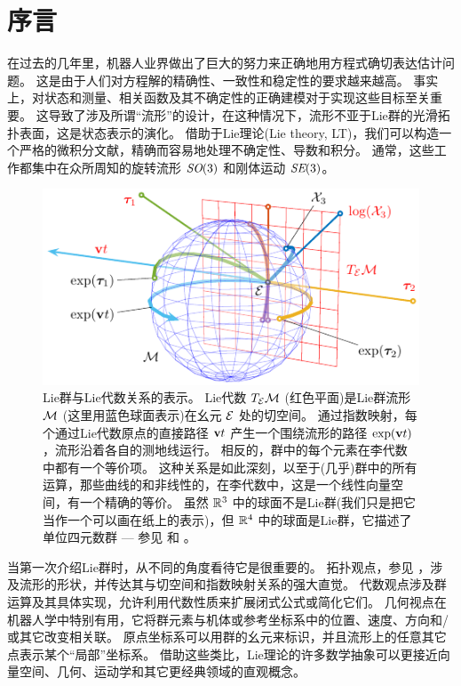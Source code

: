 
\section{序言}
\label{sec:intro}

在过去的几年里，机器人业界做出了巨大的努力来正确地用方程式确切表达估计问题。 
这是由于人们对方程解的精确性、一致性和稳定性的要求越来越高。 
事实上，对状态和测量、相关函数及其不确定性的正确建模对于实现这些目标至关重要。
这导致了涉及所谓“流形”的设计，在这种情况下，流形不亚于Lie群的光滑拓扑表面，这是状态表示的演化。
借助于Lie理论(Lie theory, LT)，我们可以构造一个严格的微积分文献，精确而容易地处理不确定性、导数和积分。
通常，这些工作都集中在众所周知的旋转流形 $\textit{SO}(3)$ 和刚体运动 $\textit{SE}(3)$。

\begin{figure}[tb]
\centering
\includegraphics{figures/exponential}
\caption{Lie群与Lie代数关系的表示。
Lie代数 $T_{\mathcal{E}}{\mathcal{M}}$ (红色平面)是Lie群流形 $\mathcal{M}$ (这里用蓝色球面表示)在幺元 $\mathcal{E}$ 处的切空间。
通过指数映射，每个通过Lie代数原点的直接路径 ${\bf v} t$ 产生一个围绕流形的路径 $\exp({\bf v} t)$ ，流形沿着各自的测地线运行。 
相反的，群中的每个元素在李代数中都有一个等价项。
这种关系是如此深刻，以至于(几乎)群中的所有运算，那些曲线的和非线性的，在李代数中，这是一个线性向量空间，有一个精确的等价。
虽然 ${\mathbb R}^3$ 中的球面不是Lie群(我们只是把它当作一个可以画在纸上的表示)，但 ${\mathbb R}^4$ 中的球面是Lie群，它描述了单位四元数群 --- 参见  和  。
}
\label{fig:exponential}
\end{figure}

当第一次介绍Lie群时，从不同的角度看待它是很重要的。 
拓扑观点，参见  ，涉及流形的形状，并传达其与切空间和指数映射关系的强大直觉。
代数观点涉及群运算及其具体实现，允许利用代数性质来扩展闭式公式或简化它们。
几何视点在机器人学中特别有用，它将群元素与机体或参考坐标系中的位置、速度、方向和/或其它改变相关联。
原点坐标系可以用群的幺元来标识，并且流形上的任意其它点表示某个“局部”坐标系。
借助这些类比，Lie理论的许多数学抽象可以更接近向量空间、几何、运动学和其它更经典领域的直观概念。


